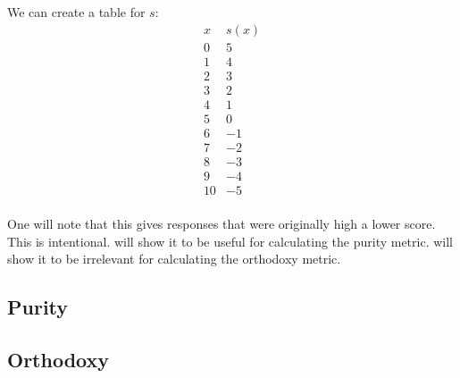 We can create a table for $s$:
\begin{equation*}
	\begin{array}{l|r}
		x  & s(x)\\\hline
		0  &  5\\
		1  &  4\\
		2  &  3\\
		3  &  2\\
		4  &  1\\
		5  &  0\\
		6  & -1\\
		7  & -2\\
		8  & -3\\
		9  & -4\\
		10 & -5\\
	\end{array}
\end{equation*}

One will note that this gives responses that were originally high a lower score.
This is intentional.
 will show it to be useful for calculating the purity metric.
 will show it to be irrelevant for calculating the orthodoxy metric.

\subsection{Purity}\label{subsec:purityMetric}

\subsection{Orthodoxy}\label{subsec:orthodoxyMetric}
